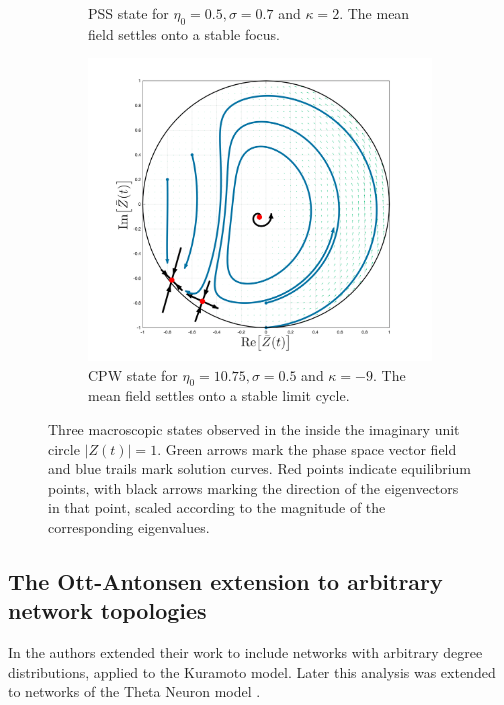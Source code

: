 \begin{figure}[H]
\begin{subfigure}[b]{0.32\linewidth}
   \caption{PSS state for $\eta_0 = 0.5, \sigma = 0.7$ and $\kappa= 2$. The mean field settles onto a stable focus.}
   \label{fig:MFRPSS}
\end{subfigure} \hfill
\begin{subfigure}[b]{0.32\linewidth}
   \centering
  \includegraphics[width=\linewidth, trim={2cm 1cm 2cm 1.5cm },clip]{../Figures/PhaseSpace/MFRCPW.png}
   \caption{CPW state for $\eta_0 = 10.75, \sigma = 0.5$ and $\kappa= -9$. The mean field settles onto a stable limit cycle.}
   \label{fig:MFRCPW}
\end{subfigure}
   \caption{Three macroscopic states observed in the \MFR inside the imaginary unit circle $|Z(t)| = 1$. Green arrows mark the phase space vector field and blue trails mark solution curves. Red points indicate equilibrium points, with black arrows marking the direction of the eigenvectors in that point, scaled according to the magnitude of the corresponding eigenvalues.}
   \label{fig:macroscopicstatesfixeddegree}
\end{figure}


\subsection{The Ott-Antonsen extension to arbitrary network topologies}
In \cite{Restrepo2014} the authors extended their work to include networks with arbitrary degree distributions, applied to the Kuramoto model. Later this analysis was extended to networks of the Theta Neuron model \cite{OttAntonsen2017}. \\

